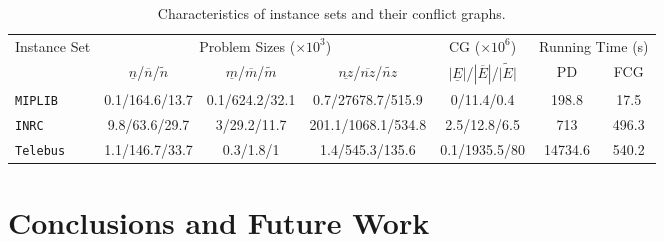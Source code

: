 \documentclass{endm}
\begin{document}
\begin{table}[h]
\scriptsize
\caption{Characteristics of instance sets and their conflict graphs.}\label{tab:inst}
\begin{center}
\begin{tabular}{|l|c|c|c|c|c|c|}
\hline 
\multirow{2}{*}{{Instance Set}} & \multicolumn{3}{c|}{{Problem Sizes ($\times10^{3}$)}} & {CG ($\times10^{6}$)} & \multicolumn{2}{c|}{{Running Time (s)}}\tabularnewline
\cline{2-7} 
 & {$\underline{n}$/$\overline{n}$/$\tilde{n}$} & {$\underline{m}$/$\overline{m}$/$\tilde{m}$} & {$\underline{nz}$/$\overline{nz}$/$\tilde{nz}$} & {$|\underline{E}|$/$|\overline{E}|$/$\tilde{|E|}$} & {PD} & {FCG}\tabularnewline
\hline 
\hline 
\texttt{MIPLIB} & {0.1/164.6/13.7} & {0.1/624.2/32.1} & {0.7/27678.7/515.9} & {0/11.4/0.4} & {198.8} & {17.5}\tabularnewline
\hline 
\texttt{INRC} & {9.8/63.6/29.7} & {3/29.2/11.7} & {201.1/1068.1/534.8} & {2.5/12.8/6.5} & {713} & {496.3}\tabularnewline
\hline 
\texttt{Telebus} & {1.1/146.7/33.7} & {0.3/1.8/1} & {1.4/545.3/135.6} & {0.1/1935.5/80} & {14734.6} & {540.2}\tabularnewline
\hline 
\end{tabular}
\end{center}
\end{table}



\section{Conclusions and Future Work}\label{conclusions}



\end{document}
